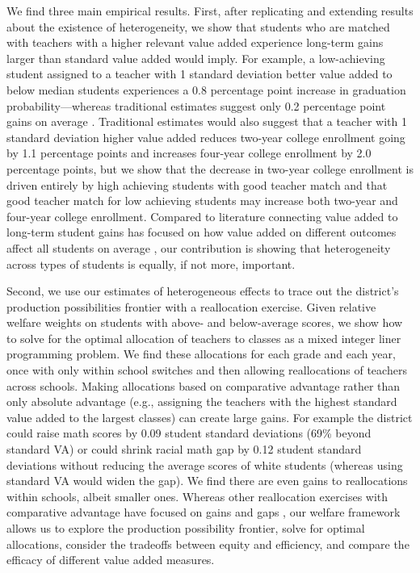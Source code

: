 \documentclass{article}
\theoremstyle{definition}
\theoremstyle{definition}
\theoremstyle{definition}
\begin{document}
We find three main empirical results. First, after replicating and extending results about the existence of heterogeneity, we show that students who are matched with teachers with a higher relevant value added experience long-term gains larger than standard value added would imply. For example, a low-achieving student assigned to a teacher with 1 standard deviation better value added to below median students experiences a 0.8 percentage point increase in graduation probability---whereas traditional estimates suggest only 0.2 percentage point gains on average \citep[][]{pope2017multidimensional}. Traditional estimates would also suggest that a teacher with 1 standard deviation higher value added reduces two-year college enrollment going by 1.1 percentage points and increases four-year college enrollment by 2.0 percentage points, but we show that the decrease in two-year college enrollment is driven entirely by high achieving students with good teacher match and that good teacher match for low achieving students may increase both two-year and four-year college enrollment. Compared to literature connecting value added to long-term student gains has focused on how value added on different outcomes affect all students on average \citep{chetty2014measuring2,pope2017multidimensional,gilraine2021making}, our contribution is showing that heterogeneity across types of students is equally, if not more, important.

Second, we use our estimates of heterogeneous effects to trace out the district’s production possibilities frontier with a reallocation exercise. Given relative welfare weights on students with above- and below-average scores, we show how to solve for the optimal allocation of teachers to classes as a mixed integer liner programming problem. We find these allocations for each grade and each year, once with only within school switches and then allowing reallocations of teachers across schools. Making allocations based on comparative advantage rather than only absolute advantage (e.g., assigning the teachers with the highest standard value added to the largest classes) can create large gains. For example the district could raise math scores by 0.09 student standard deviations (69\% beyond standard VA) or could shrink racial math gap by 0.12 student standard deviations without reducing the average scores of white students (whereas using standard VA would widen the gap). We find there are even gains to reallocations within schools, albeit smaller ones. Whereas other reallocation exercises with comparative advantage have focused on gains and gaps \citep[e.g.,][]{Delgado2020}, our welfare framework allows us to explore the production possibility frontier, solve for optimal allocations,  consider the tradeoffs between equity and efficiency, and compare the efficacy of different value added measures.
\end{document}
